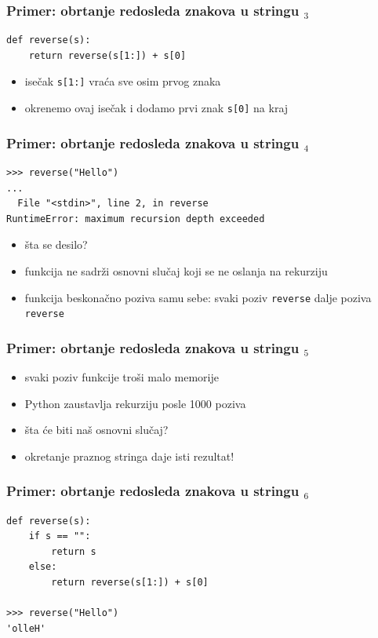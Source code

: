 \documentclass[utf8,compress,aspectratio=169]{beamer}
\begin{document}
\begin{frame}[fragile]
  \frametitle{Primer: obrtanje redosleda znakova u stringu $_3$}
\begin{verbatim}
def reverse(s):
    return reverse(s[1:]) + s[0]
\end{verbatim}
  \begin{itemize}
    \item isečak \texttt{s[1:]} vraća sve osim prvog znaka
    \item okrenemo ovaj isečak i dodamo prvi znak \texttt{s[0]} na kraj
  \end{itemize}
\end{frame}

\begin{frame}[fragile]
  \frametitle{Primer: obrtanje redosleda znakova u stringu $_4$}
\begin{verbatim}
>>> reverse("Hello")
...
  File "<stdin>", line 2, in reverse
RuntimeError: maximum recursion depth exceeded
\end{verbatim}
  \begin{itemize}
    \item šta se desilo?
    \item funkcija ne sadrži osnovni slučaj koji se ne oslanja na rekurziju
    \item funkcija beskonačno poziva samu sebe: svaki poziv \texttt{reverse} dalje poziva \texttt{reverse}
  \end{itemize}
\end{frame}

\begin{frame}[fragile]
  \frametitle{Primer: obrtanje redosleda znakova u stringu $_5$}
  \begin{itemize}
    \item svaki poziv funkcije troši malo memorije
    \item Python zaustavlja rekurziju posle 1000 poziva
    \item šta će biti naš osnovni slučaj?
    \item okretanje praznog stringa daje isti rezultat!
  \end{itemize}
\end{frame}

\begin{frame}[fragile]
  \frametitle{Primer: obrtanje redosleda znakova u stringu $_6$}
\begin{verbatim}
def reverse(s):
    if s == "":
        return s
    else:
        return reverse(s[1:]) + s[0]

>>> reverse("Hello")
'olleH'
\end{verbatim}
\end{frame}
\end{document}
